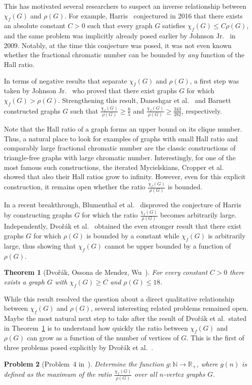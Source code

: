 \documentclass[a4paper,10pt]{amsart}
\newtheorem{theorem}{Theorem}[section]
\newtheorem{problem}[theorem]{Problem}
\begin{document}
This has motivated several researchers to suspect an inverse relationship between $\chi_f(G)$ and $\rho(G)$. For example, Harris~\cite{harris} conjectured in 2016 that there exists an absolute constant $C>0$ such that every graph $G$ satisfies $\chi_f(G)\le C\rho(G)$, and the same problem was implicitly already posed earlier by Johnson Jr.~\cite{johnson2009} in 2009. Notably, at the time this conjecture was posed, it was not even known whether the fractional chromatic number can be bounded by \emph{any} function of the Hall ratio.

In terms of negative results that separate $\chi_f(G)$ and $\rho(G)$, a first step was taken by Johnson Jr.~\cite{johnson2009} who proved that there exist graphs $G$ for which $\chi_f(G)>\rho(G)$. Strengthening this result, Daneshgar et al.~\cite{daneshgar} and Barnett~\cite{barnett} constructed graphs $G$ such that $\frac{\chi_f(G)}{\rho(G)}\ge \frac{6}{5}$ and $\frac{\chi_f(G)}{\rho(G)}\ge \frac{343}{282}$, respectively. 

Note that the Hall ratio of a graph forms an upper bound on its clique number. Thus, a natural place to look for examples of graphs with small Hall ratio and comparably large fractional chromatic number are the classic constructions of triangle-free graphs with large chromatic number. Interestingly, for one of the most famous such constructions, the iterated Mycielskians, Cropper et al.~\cite{cropper} showed that also their Hall ratios grow to infinity. However, even for this explicit construction, it remains open whether the ratio $\frac{\chi_f(G)}{\rho(G)}$ is bounded.

In a recent breakthrough, Blumenthal et al.~\cite{blumenthal} disproved the conjecture of Harris by constructing graphs $G$ for which the ratio $\frac{\chi_f(G)}{\rho(G)}$ becomes arbitrarily large. Independently, Dvo\v{r}\'{a}k et al.~\cite{dvorak} obtained the even stronger result that there exist graphs $G$ for which $\rho(G)$ is bounded by a constant while $\chi_f(G)$ is arbitrarily large, thus showing that $\chi_f(G)$ cannot be upper bounded by a function of $\rho(G)$. 

\begin{theorem}[Dvo\v{r}\'{a}k, Ossona de Mendez, Wu~\cite{dvorak}]\label{thm:dvorak}
For every constant $C>0$ there exists a graph $G$ with $\chi_f(G)\ge C$ and $\rho(G)\le 18$.  
\end{theorem}

While this result resolved the question about a direct qualitative relationship between $\chi_f(G)$ and $\rho(G)$, several interesting related problems remained open. Maybe the most natural next step to take after the result of Dvo\v{r}\'{a}k et al.~stated in Theorem~\ref{thm:dvorak} is to understand how quickly the ratio between $\chi_f(G)$ and $\rho(G)$ can grow as a function of the number of vertices of $G$. This is the first of three problems posed explicitly by Dvo\v{r}\'{a}k et al.~\cite{dvorak}.
\begin{problem}[Problem~4 in~\cite{dvorak}]\label{prob:4}
Determine the function $g:\mathbb{N}\rightarrow \mathbb{R}_+$, where 
$g(n)$ is defined as the maximum of the ratio $\frac{\chi_f(G)}{\rho(G)}$ over all $n$-vertex graphs $G$.
\end{problem}
\end{document}
